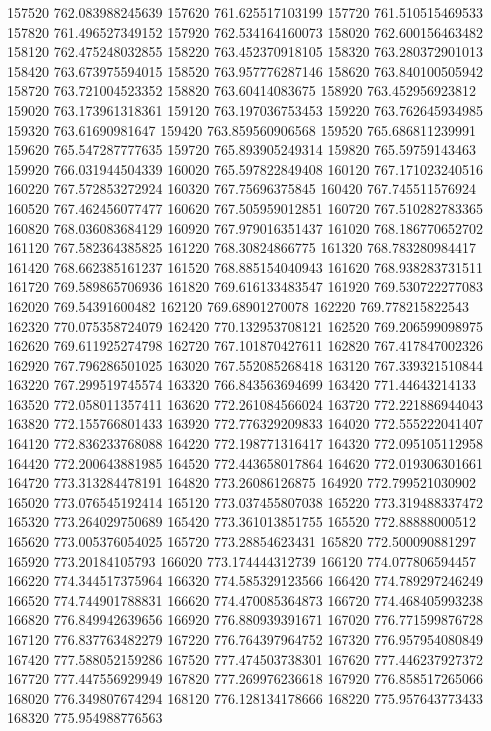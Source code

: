 {157520 762.083988245639
157620 761.625517103199
157720 761.510515469533
157820 761.496527349152
157920 762.534164160073
158020 762.600156463482
158120 762.475248032855
158220 763.452370918105
158320 763.280372901013
158420 763.673975594015
158520 763.957776287146
158620 763.840100505942
158720 763.721004523352
158820 763.60414083675
158920 763.452956923812
159020 763.173961318361
159120 763.197036753453
159220 763.762645934985
159320 763.61690981647
159420 763.859560906568
159520 765.686811239991
159620 765.547287777635
159720 765.893905249314
159820 765.59759143463
159920 766.031944504339
160020 765.597822849408
160120 767.171023240516
160220 767.572853272924
160320 767.75696375845
160420 767.745511576924
160520 767.462456077477
160620 767.505959012851
160720 767.510282783365
160820 768.036083684129
160920 767.979016351437
161020 768.186770652702
161120 767.582364385825
161220 768.30824866775
161320 768.783280984417
161420 768.662385161237
161520 768.885154040943
161620 768.938283731511
161720 769.589865706936
161820 769.616133483547
161920 769.530722277083
162020 769.54391600482
162120 769.68901270078
162220 769.778215822543
162320 770.075358724079
162420 770.132953708121
162520 769.206599098975
162620 769.611925274798
162720 767.101870427611
162820 767.417847002326
162920 767.796286501025
163020 767.552085268418
163120 767.339321510844
163220 767.299519745574
163320 766.843563694699
163420 771.44643214133
163520 772.058011357411
163620 772.261084566024
163720 772.221886944043
163820 772.155766801433
163920 772.776329209833
164020 772.555222041407
164120 772.836233768088
164220 772.198771316417
164320 772.095105112958
164420 772.200643881985
164520 772.443658017864
164620 772.019306301661
164720 773.313284478191
164820 773.26086126875
164920 772.799521030902
165020 773.076545192414
165120 773.037455807038
165220 773.319488337472
165320 773.264029750689
165420 773.361013851755
165520 772.88888000512
165620 773.005376054025
165720 773.28854623431
165820 772.500090881297
165920 773.20184105793
166020 773.174444312739
166120 774.077806594457
166220 774.344517375964
166320 774.585329123566
166420 774.789297246249
166520 774.744901788831
166620 774.470085364873
166720 774.468405993238
166820 776.849942639656
166920 776.880939391671
167020 776.771599876728
167120 776.837763482279
167220 776.764397964752
167320 776.957954080849
167420 777.588052159286
167520 777.474503738301
167620 777.446237927372
167720 777.447556929949
167820 777.269976236618
167920 776.858517265066
168020 776.349807674294
168120 776.128134178666
168220 775.957643773433
168320 775.954988776563
}
